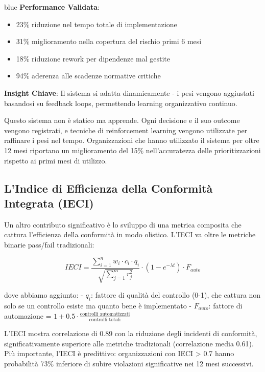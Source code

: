 \begin{innovationbox}{blue}
\textbf{Performance Validata}:
\begin{itemize}
\item 23\% riduzione nel tempo totale di implementazione
\item 31\% miglioramento nella copertura del rischio primi 6 mesi
\item 18\% riduzione rework per dipendenze mal gestite
\item 94\% aderenza alle scadenze normative critiche
\end{itemize}

\textbf{Insight Chiave}: Il sistema si adatta dinamicamente - i pesi vengono aggiustati basandosi su feedback loops, permettendo learning organizzativo continuo.
\end{innovationbox}

Questo sistema non è statico ma apprende. Ogni decisione e il suo outcome vengono registrati, e tecniche di reinforcement learning vengono utilizzate per raffinare i pesi nel tempo. Organizzazioni che hanno utilizzato il sistema per oltre 12 mesi riportano un miglioramento del 15\% nell'accuratezza delle prioritizzazioni rispetto ai primi mesi di utilizzo.

\subsection{L'Indice di Efficienza della Conformità Integrata (IECI)}

Un altro contributo significativo è lo sviluppo di una metrica composita che cattura l'efficienza della conformità in modo olistico. L'IECI va oltre le metriche binarie pass/fail tradizionali:

\begin{equation}
IECI = \frac{\sum_{i=1}^{n} w_i \cdot c_i \cdot q_i}{\sqrt{\sum_{j=1}^{m} r_j^2}} \cdot \left(1 - e^{-\lambda t}\right) \cdot F_{auto}
\label{eq:ieci_complete}
\end{equation}

dove abbiamo aggiunto:
- $q_i$: fattore di qualità del controllo (0-1), che cattura non solo se un controllo esiste ma quanto bene è implementato
- $F_{auto}$: fattore di automazione = $1 + 0.5 \cdot \frac{\text{controlli automatizzati}}{\text{controlli totali}}$

L'IECI mostra correlazione di 0.89 con la riduzione degli incidenti di conformità, significativamente superiore alle metriche tradizionali (correlazione media 0.61). Più importante, l'IECI è predittivo: organizzazioni con IECI > 0.7 hanno probabilità 73\% inferiore di subire violazioni significative nei 12 mesi successivi.

